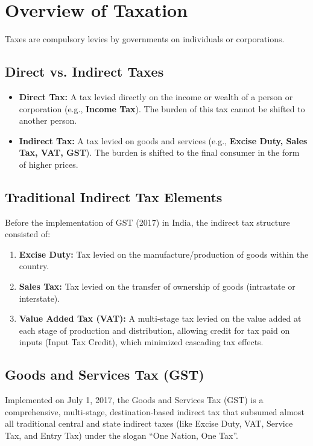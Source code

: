 \documentclass[12pt,a4paper]{article}
\begin{document}
\section{Overview of Taxation}

Taxes are compulsory levies by governments on individuals or corporations.

\subsection{Direct vs. Indirect Taxes}
\begin{itemize}[leftmargin=*, itemsep=3.5pt]
  \item \textbf{Direct Tax:} A tax levied directly on the income or wealth of a person or corporation (e.g., \textbf{Income Tax}). The burden of this tax cannot be shifted to another person.
  \item \textbf{Indirect Tax:} A tax levied on goods and services (e.g., \textbf{Excise Duty, Sales Tax, VAT, GST}). The burden is shifted to the final consumer in the form of higher prices.
\end{itemize}

\subsection{Traditional Indirect Tax Elements}
Before the implementation of GST (2017) in India, the indirect tax structure consisted of:
\begin{enumerate}[label=\textbf{\alph*.}, leftmargin=*, itemsep=2.5pt]
  \item \textbf{Excise Duty:} Tax levied on the manufacture/production of goods within the country.
  \item \textbf{Sales Tax:} Tax levied on the transfer of ownership of goods (intrastate or interstate).
  \item \textbf{Value Added Tax (VAT):} A multi-stage tax levied on the value added at each stage of production and distribution, allowing credit for tax paid on inputs (Input Tax Credit), which minimized cascading tax effects.
\end{enumerate}

\subsection{Goods and Services Tax (GST)}
Implemented on July 1, 2017, the Goods and Services Tax (GST) is a comprehensive, multi-stage, destination-based indirect tax that subsumed almost all traditional central and state indirect taxes (like Excise Duty, VAT, Service Tax, and Entry Tax) under the slogan ``One Nation, One Tax''.
\end{document}
